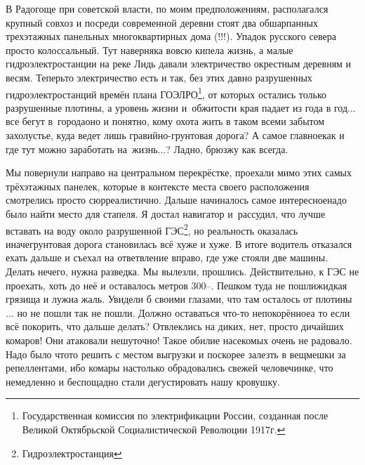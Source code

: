 \renewcommand*{\thefootnote}{\arabic{footnote}}
В Радогоще при советской власти, по моим предположениям, располагался крупный совхоз и посреди современной деревни стоят два обшарпанных трехэтажных панельных многоквартирных дома (!!!). Упадок русского севера просто колоссальный. Тут наверняка вовсю кипела жизнь, а малые гидроэлектростанции на реке Лидь давали электричество окрестным деревням и весям. Теперь\sdash то электричество есть и так, без этих давно разрушенных гидроэлектростанций времён плана ГОЭЛРО\footnote[1]{Государственная комиссия по электрификации России, созданная после Великой Октябрьской Социалистической Революции 1917г.}, от которых остались только разрушенные плотины, а уровень жизни и~обжитости края падает из года в год$\ldots$ все бегут в~города\mdash оно и понятно, кому охота жить в таком всеми забытом захолустье, куда ведет лишь гравийно-грунтовая дорога? А самое главное\mdash как и где тут можно заработать на~жизнь$\ldots$? Ладно, брюзжу как всегда. 

Мы повернули направо на центральном перекрёстке, проехали мимо этих самых трёхэтажных панелек, которые в контексте места своего расположения смотрелись просто сюрреалистично. Дальше начиналось самое интересное\mdash надо было найти место для стапеля. Я достал навигатор и~рассудил, что лучше вставать на воду около разрушенной ГЭС\footnote[2]{Гидроэлектростанция}, но реальность оказалась иначе\mdash грунтовая дорога становилась всё хуже и хуже. В итоге водитель отказался ехать дальше и съехал на ответвление вправо, где уже стояли две машины. Делать нечего, нужна разведка. Мы вылезли, прошлись. Действительно, к ГЭС не проехать, хоть до неё и оставалось метров 300\thinspace\nobreakdash--. Пешком туда не пошли\mdash жидкая грязища и лужи\mdash а жаль. Увидели б своими глазами, что там осталось от плотины$\ldots$ но не пошли так не пошли. Должно оставаться что-то непокорённое\mdash а то если всё покорить, что дальше делать? Отвлеклись на диких, нет, просто дичайших комаров! Они атаковали нешуточно! Такое обилие насекомых очень не радовало. Надо было что\sdash то решить с местом выгрузки и поскорее залезть в вещмешки за репеллентами, ибо комары настолько обрадовались свежей человечинке, что немедленно и беспощадно стали дегустировать нашу кровушку.

